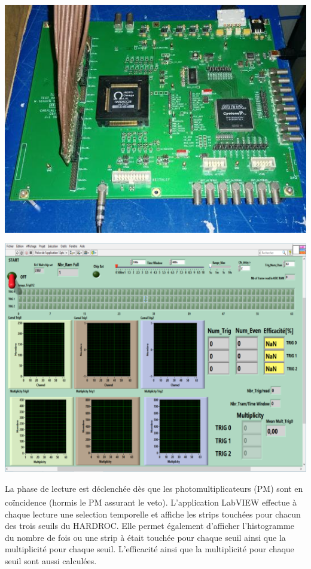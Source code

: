 \noindent
\begin{minipage}[t]{.48\textwidth}
	\noindent
	\centering
	\includegraphics[width=1\textwidth]{GLA/carte.jpg}
	\label{carte}
\end{minipage}%
\hfill
\begin{minipage}[t]{.48\textwidth}
	\noindent
	\centering
	\includegraphics[width=1\textwidth]{GLA/labview.png}
	\label{labview}
\end{minipage}

La phase de lecture est déclenchée dès que les photomultiplicateurs (PM) sont en coïncidence (hormis le PM assurant le veto). L'application LabVIEW\textsuperscript{\textregistered} effectue à chaque lecture une selection temporelle et affiche les strips touchées pour chacun des trois seuils du HARDROC. Elle permet également d'afficher l'histogramme du nombre de fois ou une strip à était touchée pour chaque seuil ainsi que la multiplicité pour chaque seuil. L'efficacité ainsi que la multiplicité pour chaque seuil sont aussi calculées.

